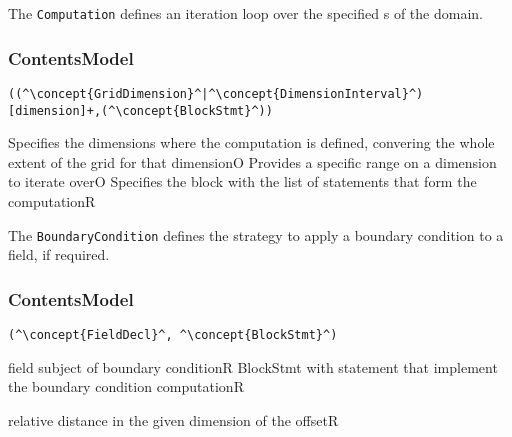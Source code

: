 The {\tt Computation} defines an iteration loop over the specified s of the domain.

\subsubsection*{ContentsModel}{}

\begin{lstlisting}[style=default]
((^\concept{GridDimension}^|^\concept{DimensionInterval}^)[dimension]+,(^\concept{BlockStmt}^))
\end{lstlisting}

\begin{HIRChildElements}
	{Specifies the dimensions where the computation is defined,
		convering the whole extent of the grid for that dimension}{O}
	{Provides a specific range on a dimension to iterate over}{O}
	{Specifies the block with the list of statements that form the computation}{R}
\end{HIRChildElements}


The {\tt BoundaryCondition} defines the strategy to apply a boundary condition to a field, if required.

\subsubsection*{ContentsModel}{}

\begin{lstlisting}[style=default]
(^\concept{FieldDecl}^, ^\concept{BlockStmt}^)
\end{lstlisting}

\begin{HIRChildElements}
	{field subject of boundary condition}{R}
	{BlockStmt with statement that implement the boundary condition computation}{R}

\end{HIRChildElements}

\begin{HIRAttributes}
	{relative distance in the given dimension of the offset}{R}
\end{HIRAttributes}
